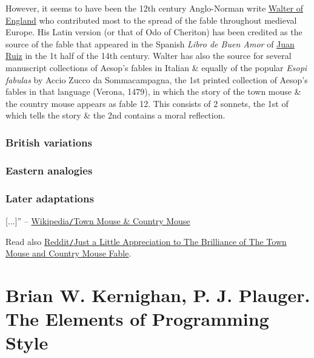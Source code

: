 \documentclass{article}
\begin{document}
However, it seems to have been the 12th century Anglo-Norman write \href{https://en.wikipedia.org/wiki/Walter_of_England}{Walter of England} who contributed most to the spread of the fable throughout medieval Europe. His Latin version (or that of Odo of Cheriton) has been credited as the source of the fable that appeared in the Spanish {\it Libro de Buen Amor} of \href{https://en.wikipedia.org/wiki/Juan_Ruiz}{\sc Juan Ruiz} in the 1t half of the 14th century. Walter has also the source for several manuscript collections of Aesop's fables in Italian \& equally of the popular {\it Esopi fabulas} by Accio Zucco da Sommacampagna, the 1st printed collection of Aesop's fables in that language (Verona, 1479), in which the story of the town mouse \& the country mouse appears as fable 12. This consists of 2 sonnets, the 1st of which tells the story \& the 2nd contains a moral reflection.

\subsubsection{British variations}

\subsubsection{Eastern analogies}

\subsubsection{Later adaptations}
[$\ldots$]'' -- \href{https://en.wikipedia.org/wiki/The_Town_Mouse_and_the_Country_Mouse}{Wikipedia{\tt/}Town Mouse \& Country Mouse}

Read also \href{https://www.reddit.com/r/ChainsawMan/comments/ghj22b/just_a_little_appreciation_to_the_brilliance_of/}{Reddit{\tt/}Just a Little Appreciation to The Brilliance of The Town Mouse and Country Mouse Fable}.


\section{{\sc Brian W. Kernighan, P. J. Plauger}. The Elements of Programming Style}
\end{document}
